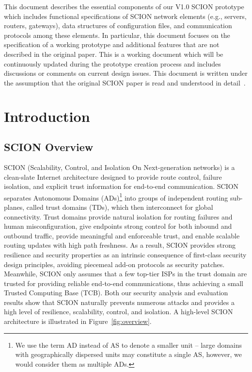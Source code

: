 
\abstract

This document describes the essential components of our V1.0 SCION prototype which
includes functional specifications of SCION network elements (e.g., servers,
routers, gateways), data structures of configuration files, and communication protocols among
these elements. In particular, this document focuses on the
specification of a working prototype and additional features that are not
described in the original paper. This is a working document which will be continuously updated
during the prototype creation process and includes discussions or comments on
current design issues. This document is written under the assumption that the original
SCION paper is read and understood in detail~\cite{ZHHCPA2011}.

\section{Introduction}

\subsection{SCION Overview}

SCION (Scalability, Control, and Isolation On Next-generation networks) is a
clean-slate Internet architecture designed to provide route control, failure
isolation, and explicit trust information for end-to-end communication. SCION
separates Autonomous Domains (ADs)\footnote{We use the term AD instead of AS to
  denote a smaller unit -- large domains with geographically dispersed units may
  constitute a single AS, however, we would consider them as multiple ADs.} into
groups of independent routing sub-planes, called trust domains (TDs), which then
interconnect for global connectivity. Trust domains provide natural isolation
for routing failures and human misconfiguration, give endpoints strong control
for both inbound and outbound traffic, provide meaningful and enforceable trust,
and enable scalable routing updates with high path freshness. As a result, SCION
provides strong resilience and security properties as an intrinsic consequence
of first-class security design principles, avoiding piecemeal add-on protocols
as security patches. Meanwhile, SCION only assumes that a few top-tier ISPs in
the trust domain are trusted for providing reliable end-to-end communications,
thus achieving a small Trusted Computing Base (TCB). Both our security analysis
and evaluation results show that SCION naturally prevents numerous attacks and
provides a high level of resilience, scalability, control, and isolation. A
high-level SCION architecture is illustrated in Figure~\ref{fig:overview}.

